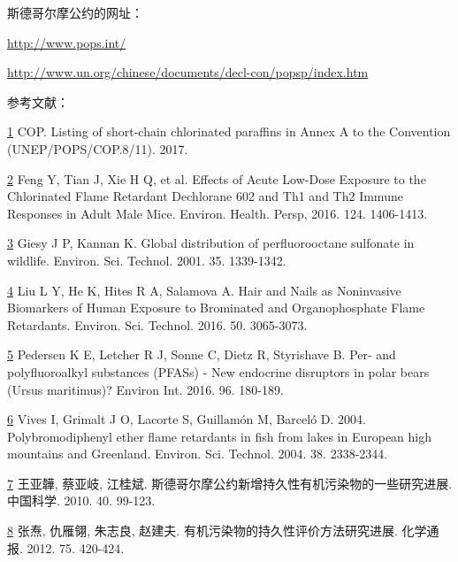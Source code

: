 \documentclass[]{book}
\begin{document}
斯德哥尔摩公约的网址：

\url{http://www.pops.int/}

\url{http://www.un.org/chinese/documents/decl-con/popsp/index.htm}

参考文献：

\href{陈心想，耿增超。西北农林科技大学学报（自然科学版），2013，41:\%20167-174．}{1}
COP. Listing of short-chain chlorinated paraffins in Annex A to the
Convention (UNEP/POPS/COP.8/11). 2017.

\href{Kezhen\%20Qian,\%20Ajay\%20Kumar,\%20et.al.\%20Renew.\%20and\%20Sustain.\%20Energy\%20Reviews,\%202015,\%2042:\%201055-1064.}{2}
Feng Y, Tian J, Xie H Q, et al. Effects of Acute Low-Dose Exposure to
the Chlorinated Flame Retardant Dechlorane 602 and Th1 and Th2 Immune
Responses in Adult Male Mice. Environ. Health. Persp, 2016. 124.
1406-1413.

\href{Puga\%20A\%20P,\%20Abreu\%20C\%20A,\%20et\%20al.\%20J.\%20of\%20Environ.\%20Manage.,\%202015,\%20159:\%2086–93.}{3}
Giesy J P, Kannan K. Global distribution of perfluorooctane sulfonate in
wildlife. Environ. Sci. Technol. 2001. 35. 1339-1342.

\href{Khan\%20S,\%20Cai\%20Chao,\%20et\%20al．\%20Environ.\%20Sci.\%20\&\%20Technol.,\%202013,\%2047\%20:\%208624-8632．}{4}
Liu L Y, He K, Hites R A, Salamova A. Hair and Nails as Noninvasive
Biomarkers of Human Exposure to Brominated and Organophosphate Flame
Retardants. Environ. Sci. Technol. 2016. 50. 3065-3073.

\href{Bi\%20H,\%20Huang\%20X,\%20et\%20al.\%20Small\%202014,\%2010,\%203544.}{5}
Pedersen K E, Letcher R J, Sonne C, Dietz R, Styrishave B. Per- and
polyfluoroalkyl substances (PFASs) - New endocrine disruptors in polar
bears (Ursus maritimus)? Environ Int. 2016. 96. 180-189.

\href{Gupta\%20V\%20K,\%20Ganjali\%20M\%20R,\%20et\%20al.\%20Chemical\%20Engineering\%20Journal,\%202012,\%20197:\%20330.}{6}
Vives I, Grimalt J O, Lacorte S, Guillamón M, Barceló D. 2004.
Polybromodiphenyl ether flame retardants in fish from lakes in European
high mountains and Greenland. Environ. Sci. Technol. 2004. 38.
2338-2344.

\href{Liu\%20R\%20L,\%20Liu\%20Y,\%20et\%20al.\%20Bioresourse\%20Technology\%202014,\%20154:\%20138.}{7}
王亚韡, 蔡亚岐, 江桂斌.
斯德哥尔摩公约新增持久性有机污染物的一些研究进展. 中国科学. 2010. 40.
99-123.

\href{Gao\%20F,Qu\%20J\%20Y,\%20et\%20al.\%20Electrochim.\%20Acta\%202016,\%20190:\%201134.}{8}
张焘, 仇雁翎, 朱志良, 赵建夫. 有机污染物的持久性评价方法研究进展.
化学通报. 2012. 75. 420-424.
\end{document}
